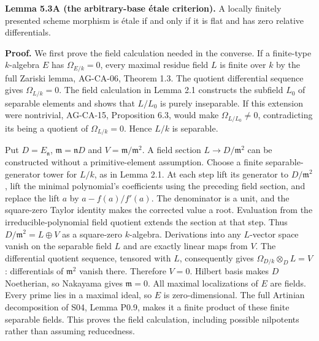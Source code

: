 \documentclass[11pt,a4paper,openany]{report}
\begin{document}
\textbf{Lemma 5.3A (the arbitrary-base étale criterion).} A locally finitely presented scheme morphism is étale if and only if it is flat and has zero relative differentials.

\textbf{Proof.} We first prove the field calculation needed in the converse. If a finite-type \(k\)-algebra \(E\) has \(\Omega_{E/k}=0\), every maximal residue field \(L\) is finite over \(k\) by the full Zariski lemma, AG-CA-06, Theorem 1.3. The quotient differential sequence gives \(\Omega_{L/k}=0\). The field calculation in Lemma 2.1 constructs the subfield \(L_0\) of separable elements and shows that \(L/L_0\) is purely inseparable. If this extension were nontrivial, AG-CA-15, Proposition 6.3, would make \(\Omega_{L/L_0}\ne0\), contradicting its being a quotient of \(\Omega_{L/k}=0\). Hence \(L/k\) is separable.

Put \(D=E_{\mathfrak n}\), \(\mathfrak m=\mathfrak nD\) and \(V=\mathfrak m/\mathfrak m^2\). A field section \(L\to D/\mathfrak m^2\) can be constructed without a primitive-element assumption. Choose a finite separable-generator tower for \(L/k\), as in Lemma 2.1. At each step lift its generator to \(D/\mathfrak m^2\), lift the minimal polynomial's coefficients using the preceding field section, and replace the lift \(a\) by \(a-f(a)/f'(a)\). The denominator is a unit, and the square-zero Taylor identity makes the corrected value a root. Evaluation from the irreducible-polynomial field quotient extends the section at that step. Thus \(D/\mathfrak m^2=L\oplus V\) as a square-zero \(k\)-algebra. Derivations into any \(L\)-vector space vanish on the separable field \(L\) and are exactly linear maps from \(V\). The differential quotient sequence, tensored with \(L\), consequently gives \(\Omega_{D/k}\otimes_DL=V\): differentials of \(\mathfrak m^2\) vanish there. Therefore \(V=0\). Hilbert basis makes \(D\) Noetherian, so Nakayama gives \(\mathfrak m=0\). All maximal localizations of \(E\) are fields. Every prime lies in a maximal ideal, so \(E\) is zero-dimensional. The full Artinian decomposition of S04, Lemma P0.9, makes it a finite product of these finite separable fields. This proves the field calculation, including possible nilpotents rather than assuming reducedness.
\end{document}
